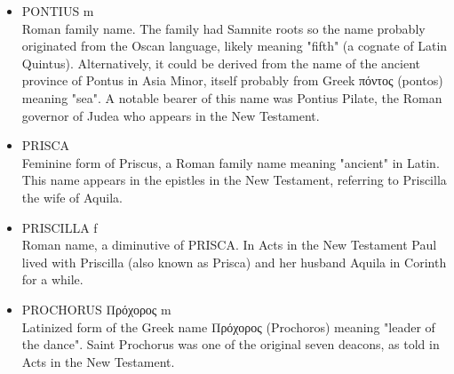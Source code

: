 \begin{itemize}
\item PONTIUS m \\
Roman family name. The family had Samnite roots so the name probably originated from the Oscan language, likely meaning "fifth" (a cognate of Latin Quintus). Alternatively, it could be derived from the name of the ancient province of Pontus in Asia Minor, itself probably from Greek πόντος (pontos) meaning "sea". A notable bearer of this name was Pontius Pilate, the Roman governor of Judea who appears in the New Testament.
\item PRISCA \\
Feminine form of Priscus, a Roman family name meaning "ancient" in Latin. This name appears in the epistles in the New Testament, referring to Priscilla the wife of Aquila.
\item PRISCILLA f \\
Roman name, a diminutive of PRISCA. In Acts in the New Testament Paul lived with Priscilla (also known as Prisca) and her husband Aquila in Corinth for a while. 

\item PROCHORUS Πρόχορος m\\
Latinized form of the Greek name Πρόχορος (Prochoros) meaning "leader of the dance". Saint Prochorus was one of the original seven deacons, as told in Acts in the New Testament.

\end{itemize}

